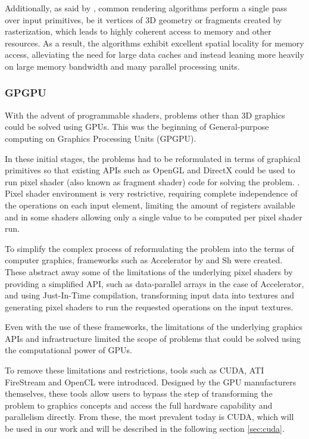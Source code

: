 Additionally, as said by \citep{book:paraproc}, common rendering algorithms perform a single pass over input primitives, be it vertices of 3D geometry or fragments created by rasterization, which leads to highly coherent access to memory and other resources. As a result, the algorithms exhibit excellent spatial locality for memory access, alleviating the need for large data caches and instead leaning more heavily on large memory bandwidth and many parallel processing units.

\subsubsection{GPGPU}
\label{sec:gpgpu}
With the advent of programmable shaders, problems other than 3D graphics could be solved using GPUs. This was the beginning of General-purpose computing on Graphics Processing Units (GPGPU).

In these initial stages, the problems had to be reformulated in terms of graphical primitives so that existing APIs such as OpenGL and DirectX could be used to run pixel shader (also known as fragment shader) code for solving the problem. \citep{paper:accelerator}. Pixel shader environment is very restrictive, requiring complete independence of the operations on each input element, limiting the amount of registers available and in some shaders allowing only a single value to be computed per pixel shader run. %

To simplify the complex process of reformulating the problem into the terms of computer graphics, frameworks such as Accelerator by \citep{paper:accelerator} and Sh %
were created. These abstract away some of the limitations of the underlying pixel shaders by providing a simplified API, such as data-parallel arrays in the case of Accelerator, and using Just-In-Time compilation, transforming input data into textures and generating pixel shaders to run the requested operations on the input textures. 

Even with the use of these frameworks, the limitations of the underlying graphics APIs and infrastructure limited the scope of problems that could be solved using the computational power of GPUs. 

To remove these limitations and restrictions, tools such as CUDA, ATI FireStream and OpenCL were introduced. Designed by the GPU manufacturers themselves, these tools allow users to bypass the step of transforming the problem to graphics concepts and access the full hardware capability and parallelism directly. From these, the most prevalent today is CUDA, which will be used in our work and will be described in the following section \ref{sec:cuda}.
 

